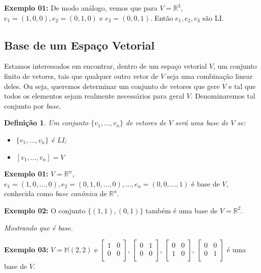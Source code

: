 \documentclass[oneside,a4paper,12pt]{article}
\newtheorem{definition}{Definição}[section]
\begin{document}
{\bf Exemplo 01:} De modo análogo, vemos que para $V = \mathbb{R}^3$, $e_1 = (1,0,0), e_2 = (0,1,0)$ e $e_3 = (0,0,1)$. Então $e_1 , e_2 , e_3$ são LI.

\subsection{Base de um Espaço Vetorial}

Estamos interessados em encontrar, dentro de um espaço vetorial $V$, um conjunto finito de vetores, tais que qualquer outro vetor de $V$ seja uma combinação linear deles. Ou seja, queremos determinar um conjunto de vetores que gere $V$ e tal que todos os elementos sejam realmente necessários para geral $V$. Denominaremos tal conjunto por \emph{base.}

\begin{definition}
	Um conjunto $\{ v_1, \dots, v_n \}$ de vetores de $V$ será uma \emph{base} de $V$ se:
	\begin{itemize}
		\item $\{ v_1, \dots, v_n \}$ é LI;
		\item $[v_1, \dots, v_n] = V$
	\end{itemize}
\end{definition}

{\bf Exemplo 01:} $V = \mathbb{R}^{n}$, $e_1 = (1,0,\dots,0), e_2 = (0,1,0, \dots, 0), \dots, e_n = (0, 0, \dots, 1)$ é base de $V$, conhecida como \emph{base canônica} de $\mathbb{R}^n$.

{\bf Exemplo 02:} O conjunto $\{ (1,1), (0,1) \}$ também é uma base de $V = \mathbb{R}^2$.

\vspace{50pt}
\emph{Mostrando que é base.}

{\bf Exemplo 03:} $V = \mathbb{M}(2,2)$ e $\left[
\begin{array}{cc}
1	&	0	\\
0	&	0	\\
\end{array}
\right]
$, 
$\left[
\begin{array}{cc}
0	&	1	\\
0	&	0	\\
\end{array}
\right]
$,
$\left[
\begin{array}{cc}
0	&	0	\\
1	&	0	\\
\end{array}
\right]
$,
$\left[
\begin{array}{cc}
0	&	0	\\
0	&	1	\\
\end{array}
\right]
$
é uma base de $V$.
\end{document}
